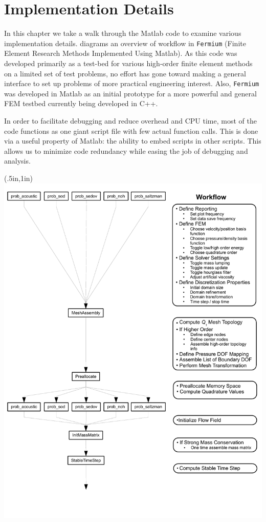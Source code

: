
\chapter{Implementation Details}
\label{Chapter3}
In this chapter we take a walk through the Matlab code to examine various implementation details.  diagrams an overview of workflow in \texttt{Fermium} (Finite Element Research Methods Implemented Using Matlab). As this code was developed primarily as a test-bed for various high-order finite element methods on a limited set of test problems, no effort has gone toward making a general interface to set up problems of more practical engineering interest. Also, \texttt{Fermium} was developed in Matlab as an initial prototype for a more powerful and general FEM testbed currently being developed in C++.

In order to facilitate debugging and reduce overhead and CPU time, most of the code functions as one giant script file with few actual function calls. This is done via a useful property of Matlab: the ability to embed scripts in other scripts. This allows us to minimize code redundancy while easing the job of debugging and analysis.

\newpage
\begin{textblock*}{7.5in}(.5in,1in)
\centering
   \includegraphics[trim = 0in .5in 0in 0in,clip,width=7.5in,keepaspectratio=true]{./Figures/CodeOutline.pdf}
\end{textblock*}
\mbox{}\clearpage
\newpage

